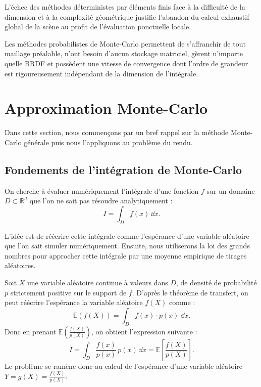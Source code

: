 L'échec des méthodes déterministes par éléments finis face à la difficulté de la dimension et à la complexité géométrique justifie l'abandon du calcul exhaustif global de la scène au profit de l'évaluation ponctuelle locale. 

Les méthodes probabilistes de Monte-Carlo permettent de s'affranchir de tout maillage préalable, n'ont besoin d'aucun stockage matriciel, gèrent n'importe quelle BRDF et possèdent une vitesse de convergence dont l'ordre de grandeur est rigoureusement indépendant de la dimension de l'intégrale.


\section{Approximation Monte-Carlo}

Dans cette section, nous commençons par un bref rappel sur la méthode Monte-Carlo générale puis nous l'appliquons au problème du rendu. 

\subsection{Fondements de l'intégration de Monte-Carlo}

On cherche à évaluer numériquement l'intégrale d'une fonction $f$ sur un domaine $D \subset \mathbb{R}^d$ que l'on ne sait pas résoudre analytiquement :
\begin{equation}
    I = \int_D f(x) \, \dd x.
\end{equation}

L'idée est de réécrire cette intégrale comme l'espérance d'une variable aléatoire que l'on sait simuler numériquement. Ensuite, nous utiliserons la loi des grands nombres pour approcher cette intégrale par une moyenne empirique de tirages aléatoires. 

\begin{proposition}
    Soit $X$ une variable aléatoire continue à valeurs dans $D$, de densité de probabilité $p$ strictement positive sur le support de $f$. D'après le théorème de transfert, on peut réécrire l'espérance la variable aléatoire $f(X)$ comme : 
    \begin{equation}
        \mathbb{E}(f(X)) = \int_D f(x) \cdot p(x) \; \dd x. 
    \end{equation}
    Donc en prenant $ \mathbb{E}\left( \frac{f(X)}{p(X)}\right)$, on obtient l'expression suivante : 
    \begin{equation}
        I = \int_D \frac{f(x)}{p(x)} \, p(x) \, \dd x = \mathbb{E}\left[ \frac{f(X)}{p(X)} \right]. 
    \end{equation}
    Le problème se ramène donc au calcul de l'espérance d'une variable aléatoire $Y = g(X) = \frac{f(X)}{p(X)}$.
\end{proposition}

